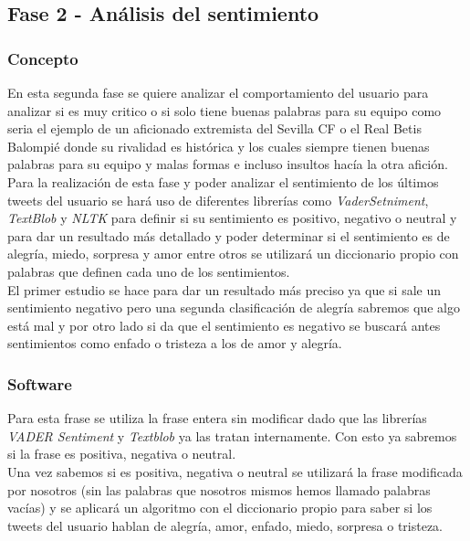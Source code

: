 \documentclass[../all.tex]{subfiles}
\begin{document}
\newpage
\subsection{Fase 2 - Análisis del sentimiento}
    \subsubsection{Concepto}
    	En esta segunda fase se quiere analizar el comportamiento del usuario para analizar si es muy critico o si solo tiene buenas palabras para su equipo como seria el ejemplo de un aficionado extremista del Sevilla CF o el Real Betis Balompié donde su rivalidad es histórica y los cuales siempre tienen buenas palabras para su equipo y malas formas e incluso insultos hacía la otra afición.\\
    	
    	Para la realización de esta fase y poder analizar el sentimiento de los últimos tweets del usuario se hará uso de diferentes librerías como  \textit{VaderSetniment},  \textit{TextBlob} y  \textit{NLTK} para definir si su sentimiento es positivo, negativo o neutral y para dar un resultado más detallado y poder determinar si el sentimiento es de alegría, miedo, sorpresa y amor entre otros se utilizará un diccionario propio con palabras que definen cada uno de los sentimientos.\\
    	
    	 El primer estudio se hace para dar un resultado más preciso ya que si sale un sentimiento negativo pero una segunda clasificación de alegría sabremos que algo está mal y por otro lado si da que el sentimiento es negativo se buscará antes sentimientos como enfado o tristeza a los de amor y alegría.
    	 
    \newpage
    \subsubsection{Software}
    
    	Para esta frase se utiliza la frase entera sin modificar dado que las librerías \textit{VADER Sentiment} y \textit{Textblob} ya las tratan internamente. Con esto ya sabremos si la frase es positiva, negativa o neutral\cite{VADER}.\\
    	
    	Una vez sabemos si es positiva, negativa o neutral se utilizará la frase modificada por nosotros (sin las palabras que nosotros mismos hemos llamado palabras vacías) y se aplicará un algoritmo con el diccionario propio para saber si los tweets del usuario hablan de alegría, amor, enfado, miedo, sorpresa o tristeza.
        
\end{document}

